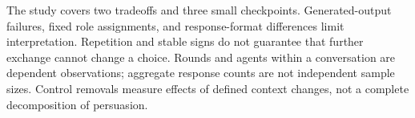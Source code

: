 \documentclass[11pt,a4paper]{article}
\begin{document}
The study covers two tradeoffs and three small checkpoints. Generated-output failures, fixed role assignments, and response-format differences limit interpretation. Repetition and stable signs do not guarantee that further exchange cannot change a choice. Rounds and agents within a conversation are dependent observations; aggregate response counts are not independent sample sizes. Control removals measure effects of defined context changes, not a complete decomposition of persuasion.
\end{document}
